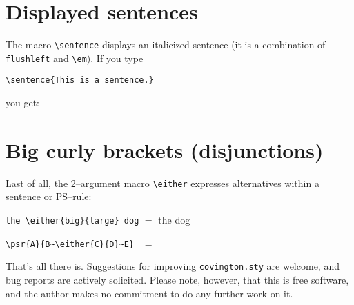 \documentclass{article}
\begin{document}
\section{Displayed sentences}

The macro \verb"\sentence" displays an italicized sentence (it is a 
combination of {\tt flushleft} and \verb"\em").  If you type
\begin{verbatim}
\sentence{This is a sentence.}
\end{verbatim}
you get:


\section{Big curly brackets (disjunctions)}

Last of all, the 2--argument macro \verb"\either" expresses alternatives
within a sentence or PS--rule:
\begin{flushleft}
\verb"the \either{big}{large} dog" $=$ the  dog \\
\end{flushleft}
\begin{flushleft}
\verb"\psr{A}{B~\either{C}{D}~E} " $=$ 
\end{flushleft}

That's all there is.
Suggestions for improving {\tt covington.sty} are welcome, and bug
reports are actively solicited.  Please note, however, that this is free
software, and the author makes no commitment to do any further work on 
it.
\end{document}
